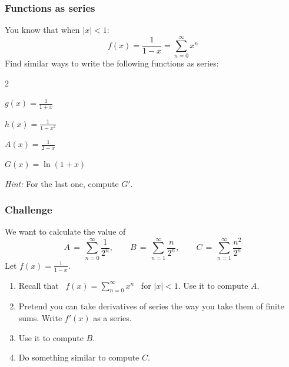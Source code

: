 \documentclass[14pt]{beamer}
\begin{document}
\begin{frame}[t]
	\fontsize{13}{13}\selectfont
	\frametitle{Functions as series}

	You know that when $|x|<1$:
	\vspace{-.2cm}
	\[
		f(x) = \frac{1}{1-x}= \sum_{n=0}^{\infty}x^{n}
	\]
	Find similar ways to write the following functions as series:
	\begin{enumerate}
	\end{enumerate}
	\vspace{.2cm}
	\emph{Hint:} For the last one, compute $G'$.
\end{frame}

\begin{frame}[t]
	\fontsize{13}{13}\selectfont
	\frametitle{Challenge}

	We want to calculate the value of
	\[
		A \, = \, \sum_{n=0}^{\infty}\frac{1}{2^{n}}, \quad \quad B \, = \, \sum_{n=1}
		^{\infty}\frac{n}{2^{n}}, \quad \quad C \, = \, \sum_{n=1}^{\infty}\frac{n^{2}}{2^{n}}
	\]
	Let $\displaystyle f(x)= \frac{1}{1-x}$.

	\hrulefill

	\begin{enumerate}
		\item Recall that \, $\displaystyle f(x) = \sum_{n=0}^{\infty}x^{n}$ \, for $\displaystyle
			|x|<1$. Use it to compute $A$.

		\item Pretend you can take derivatives of series the way you take them of finite
			sums. Write $\displaystyle f'(x)$ as a series.
			\vspace{.2cm}

		\item Use it to compute $B$.
			\vspace{.2cm}

		\item Do something similar to compute $C$.
	\end{enumerate}
\end{frame}
\end{document}

